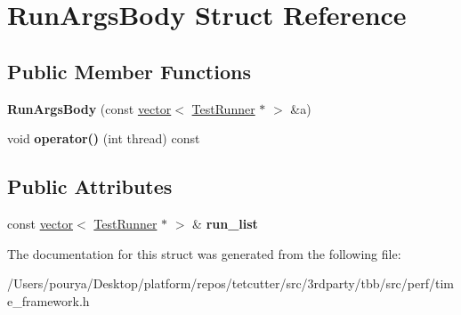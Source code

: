 \hypertarget{structRunArgsBody}{}\section{Run\+Args\+Body Struct Reference}
\label{structRunArgsBody}
\subsection*{Public Member Functions}
\begin{DoxyCompactItemize}
\item 
\hypertarget{structRunArgsBody_ab96b0e3833a7fa0b534a88c2c4f95a96}{}{\bfseries Run\+Args\+Body} (const \hyperlink{structvector}{vector}$<$ \hyperlink{classTestRunner}{Test\+Runner} $\ast$ $>$ \&a)\label{structRunArgsBody_ab96b0e3833a7fa0b534a88c2c4f95a96}

\item 
\hypertarget{structRunArgsBody_a4a087306535522d46d4ef9285695768d}{}void {\bfseries operator()} (int thread) const \label{structRunArgsBody_a4a087306535522d46d4ef9285695768d}

\end{DoxyCompactItemize}
\subsection*{Public Attributes}
\begin{DoxyCompactItemize}
\item 
\hypertarget{structRunArgsBody_a83cae463a8ccb92e027f56ec3709c144}{}const \hyperlink{structvector}{vector}$<$ \hyperlink{classTestRunner}{Test\+Runner} $\ast$ $>$ \& {\bfseries run\+\_\+list}\label{structRunArgsBody_a83cae463a8ccb92e027f56ec3709c144}

\end{DoxyCompactItemize}


The documentation for this struct was generated from the following file\+:\begin{DoxyCompactItemize}
\item 
/\+Users/pourya/\+Desktop/platform/repos/tetcutter/src/3rdparty/tbb/src/perf/time\+\_\+framework.\+h\end{DoxyCompactItemize}
